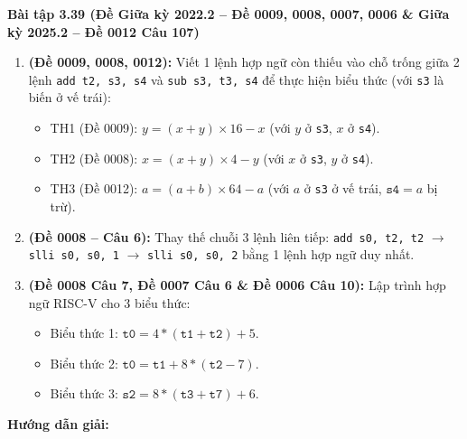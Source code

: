 \textbf{Bài tập 3.39 (Đề Giữa kỳ 2022.2 -- Đề 0009, 0008, 0007, 0006 \& Giữa kỳ 2025.2 -- Đề 0012 Câu 107)}
\begin{enumerate}[label=\alph*)]
    \item \textbf{(Đề 0009, 0008, 0012):} Viết 1 lệnh hợp ngữ còn thiếu vào chỗ trống giữa 2 lệnh \texttt{add t2, s3, s4} và \texttt{sub s3, t3, s4} để thực hiện biểu thức (với \texttt{s3} là biến ở vế trái):
    \begin{itemize}
        \item TH1 (Đề 0009): $y = (x + y) \times 16 - x$ (với $y$ ở \texttt{s3}, $x$ ở \texttt{s4}).
        \item TH2 (Đề 0008): $x = (x + y) \times 4 - y$ (với $x$ ở \texttt{s3}, $y$ ở \texttt{s4}).
        \item TH3 (Đề 0012): $a = (a + b) \times 64 - a$ (với $a$ ở \texttt{s3} ở vế trái, $\texttt{s4} = a$ bị trừ).
    \end{itemize}
    \item \textbf{(Đề 0008 -- Câu 6):} Thay thế chuỗi 3 lệnh liên tiếp: \texttt{add s0, t2, t2} $\rightarrow$ \texttt{slli s0, s0, 1} $\rightarrow$ \texttt{slli s0, s0, 2} bằng 1 lệnh hợp ngữ duy nhất.
    \item \textbf{(Đề 0008 Câu 7, Đề 0007 Câu 6 \& Đề 0006 Câu 10):} Lập trình hợp ngữ RISC-V cho 3 biểu thức:
    \begin{itemize}
        \item Biểu thức 1: $\texttt{t0} = 4 * (\texttt{t1} + \texttt{t2}) + 5$.
        \item Biểu thức 2: $\texttt{t0} = \texttt{t1} + 8 * (\texttt{t2} - 7)$.
        \item Biểu thức 3: $\texttt{s2} = 8 * (\texttt{t3} + \texttt{t7}) + 6$.
    \end{itemize}
\end{enumerate}
\textbf{Hướng dẫn giải:}
